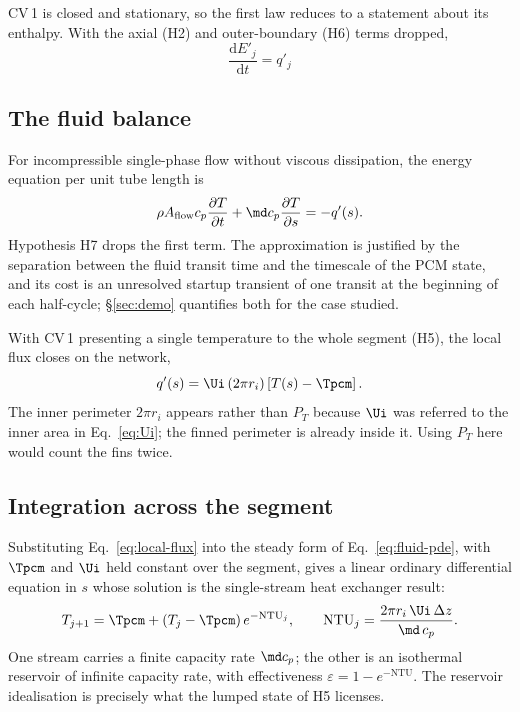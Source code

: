 CV\,1 is closed and stationary, so the first law reduces to a statement about
its enthalpy. With the axial (H2) and outer-boundary (H6) terms dropped,
\begin{equation}
  \boxed{\;\frac{\mathrm{d}E'_{j}}{\mathrm{d}t} = q'_{j}\;}
  \label{eq:pcm-balance}
\end{equation}

\subsection{The fluid balance}

For incompressible single-phase flow without viscous dissipation, the energy
equation per unit tube length is
\begin{equation}
  \rho A_{\mathrm{flow}} c_{p}\frac{\partial T}{\partial t}
  + \md c_{p}\frac{\partial T}{\partial s} = -q'(s).
  \label{eq:fluid-pde}
\end{equation}
Hypothesis H7 drops the first term. The approximation is justified by the
separation between the fluid transit time and the timescale of the PCM state,
and its cost is an unresolved startup transient of one transit at the beginning
of each half-cycle; \S\ref{sec:demo} quantifies both for the case studied.

With CV\,1 presenting a single temperature to the whole segment (H5), the local
flux closes on the network,
\begin{equation}
  q'(s) = \Ui\,(2\pi r_{i})\left[T(s)-\Tpcm\right].
  \label{eq:local-flux}
\end{equation}
The inner perimeter $2\pi r_{i}$ appears rather than $P_{T}$ because $\Ui$ was
referred to the inner area in Eq.~\eqref{eq:Ui}; the finned perimeter is already
inside it. Using $P_{T}$ here would count the fins twice.

\subsection{Integration across the segment}

Substituting Eq.~\eqref{eq:local-flux} into the steady form of
Eq.~\eqref{eq:fluid-pde}, with $\Tpcm$ and $\Ui$ held constant over the segment,
gives a linear ordinary differential equation in $s$ whose solution is the
single-stream heat exchanger result:
\begin{equation}
  T_{j+1} = \Tpcm + \left(T_{j}-\Tpcm\right)e^{-\mathrm{NTU}_{j}},
  \qquad
  \mathrm{NTU}_{j} = \frac{2\pi r_{i}\,\Ui\,\Delta z}{\md\,c_{p}}.
  \label{eq:ntu}
\end{equation}
One stream carries a finite capacity rate $\md c_{p}$; the other is an
isothermal reservoir of infinite capacity rate, with effectiveness
$\varepsilon=1-e^{-\mathrm{NTU}}$. The reservoir idealisation is precisely what
the lumped state of H5 licenses.

